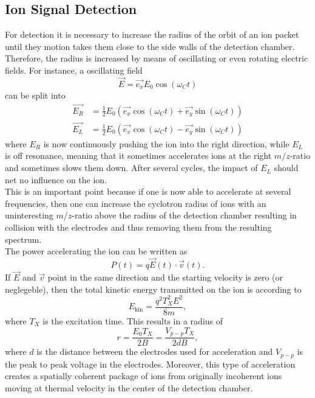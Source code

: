 \documentclass[a4paper,10pt]{article}
\begin{document}
\subsection{Ion Signal Detection}
For detection it is necessary to increase the radius of the orbit of an ion packet until they motion takes them close to the side walls of the detection chamber. Therefore, the radius is increased by means of oscillating or even rotating electric fields. For instance, a oscillating field 
\begin{equation*}
	\vec{E} = \vec{e_x} E_0 \cos(\omega_C t)
\end{equation*} 
can be split into 
\begin{equation*}
	\begin{split}
		\vec{E_R} &= \frac{1}{2} E_0 (\vec{e_x} \cos(\omega_C t) + \vec{e_y}\sin(\omega_C t)) \\
		\vec{E_L} &= \frac{1}{2} E_0 (\vec{e_x} \cos(\omega_C t) - \vec{e_y}\sin(\omega_C t))
	\end{split}
\end{equation*}
where $E_R$ is now continuously pushing the ion into the right direction, while $E_L$ is off resonance, meaning that it sometimes accelerates ions at the right $m/z$-ratio and sometimes slows them down. After several cycles, the impact of $E_L$ should net no influence on the ion. \\
This is an important point because if one is now able to accelerate at several frequencies, then one can increase the cyclotron radius of ions with an uninteresting $m/z$-ratio above the radius of the detection chamber resulting in collision with the electrodes and thus removing them from the resulting spectrum. \\
The power accelerating the ion can be written as 
\begin{equation}
	P(t) = q \vec{E}(t) \cdot \vec{v}(t).
\end{equation} 
If $\vec{E}$ and $\vec{v}$ point in the same direction and the starting velocity is zero (or neglegeble), then the total kinetic energy transmitted on the ion is according to \cite{primer}
\begin{equation}
	E_\mathrm{kin} = \frac{q^2 T_X^2 E^2}{8m},
\end{equation}
where $T_X$ is the excitation time. This results in a radius of 
\begin{equation}
	r = \frac{E_0 T_X}{2 B} = \frac{V_{p-p} T_X}{2 d B},
\end{equation}
where $d$ is the distance between the electrodes used for acceleration and $V_{p-p}$ is the peak to peak voltage in the electrodes. Moreover, this type of acceleration creates a spatially coherent package of ions from originally incoherent ions moving at thermal velocity in the center of the detection chamber.  \\
\end{document}
